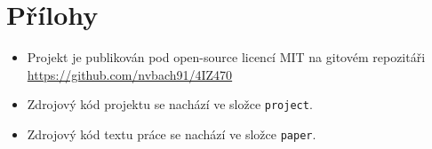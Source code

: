 \documentclass[11pt,a4paper]{article}
\begin{document}
\newpage



\section*{Přílohy}
\begin{itemize}
\item Projekt je publikován pod open-source licencí MIT na gitovém repozitáři \\ \url{https://github.com/nvbach91/4IZ470} 
\item Zdrojový kód projektu se nachází ve složce \texttt{project}.
\item Zdrojový kód textu práce se nachází ve složce \texttt{paper}.
\end{itemize}
\end{document}
